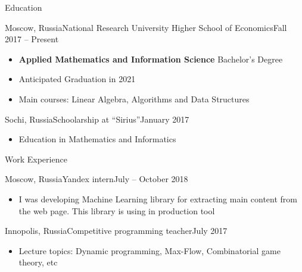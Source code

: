 \documentclass[]{mcdowellcv}
\begin{document}
	\makeheader



	\begin{cvsection}{Education}
		\begin{cvsubsection}{Moscow, Russia}{National Research University Higher School of Economics}{Fall 2017 -- Present}

                    \vskip 0.3cm

			\begin{itemize}
                            \item \textbf{Applied Mathematics and Information Science} Bachelor's Degree
                            \item Anticipated Graduation in 2021
                            \item Main courses: Linear Algebra, Algorithms and Data Structures
			\end{itemize}
		\end{cvsubsection}

                \begin{cvsubsection}{Sochi, Russia}{Schoolarship at ``Sirius''}{January 2017}
                    \begin{itemize}
                        \item Education in Mathematics and Informatics
                    \end{itemize}
                \end{cvsubsection}

	\end{cvsection}

        \begin{cvsection}{Work Experience}
            \begin{cvsubsection}{Moscow, Russia}{Yandex intern}{July -- October 2018}
                \begin{itemize}
                    \item I was developing Machine Learning library for extracting main content
                        from the web page. This library is using in production tool
                \end{itemize}
            \end{cvsubsection}
            \begin{cvsubsection}{Innopolis, Russia}{Competitive programming teacher}{July 2017}
                \vskip 0.3cm
                \begin{itemize}
                    \item Lecture topics: Dynamic programming, Max-Flow, Combinatorial game theory, etc
                \end{itemize}
            \end{cvsubsection}
        \end{cvsection}
\end{document}
